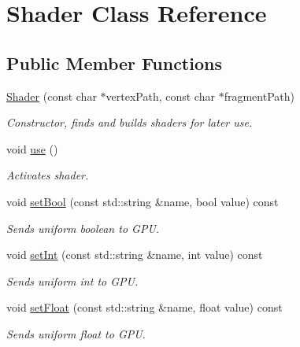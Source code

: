 \hypertarget{class_shader}{}\section{Shader Class Reference}
\label{class_shader}
\subsection*{Public Member Functions}
\begin{DoxyCompactItemize}
\item 
\mbox{\hyperlink{class_shader_a3e135bbf914b087a939114d79c10d283}{Shader}} (const char $\ast$vertex\+Path, const char $\ast$fragment\+Path)
\begin{DoxyCompactList}\small\item\em Constructor, finds and builds shaders for later use. \end{DoxyCompactList}\item 
\mbox{\label{class_shader_a870fa9f13d69e558815d6fd351a469dc}} 
void \mbox{\hyperlink{class_shader_a870fa9f13d69e558815d6fd351a469dc}{use}} ()
\begin{DoxyCompactList}\small\item\em Activates shader. \end{DoxyCompactList}\item 
\mbox{\label{class_shader_ab1a56d6c299bd7eaa18c2e142ef7bd9f}} 
void \mbox{\hyperlink{class_shader_ab1a56d6c299bd7eaa18c2e142ef7bd9f}{set\+Bool}} (const std\+::string \&name, bool value) const
\begin{DoxyCompactList}\small\item\em Sends uniform boolean to G\+PU. \end{DoxyCompactList}\item 
\mbox{\label{class_shader_ad362e2b654cd95a3574cd505411e41fd}} 
void \mbox{\hyperlink{class_shader_ad362e2b654cd95a3574cd505411e41fd}{set\+Int}} (const std\+::string \&name, int value) const
\begin{DoxyCompactList}\small\item\em Sends uniform int to G\+PU. \end{DoxyCompactList}\item 
\mbox{\label{class_shader_afe7367621f74c2d26431d8ac15252bf3}} 
void \mbox{\hyperlink{class_shader_afe7367621f74c2d26431d8ac15252bf3}{set\+Float}} (const std\+::string \&name, float value) const
\begin{DoxyCompactList}\small\item\em Sends uniform float to G\+PU. \end{DoxyCompactList}\end{DoxyCompactItemize}

